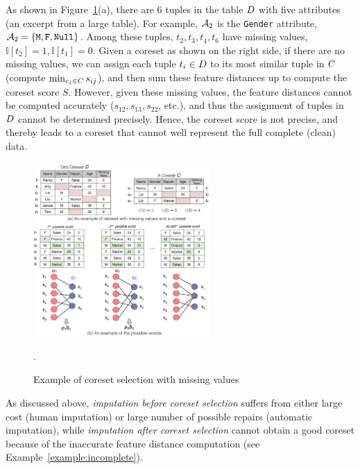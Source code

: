 \begin{example} \label{example:incomplete}
	As shown in  Figure~\ref{fig:missing}(a), there are 6 tuples in the table $D$ with five attributes (an excerpt from a large table). For example, $\mathcal{A}_2$ is the \texttt{Gender} attribute, \ie $\mathcal{A}_2 = \{ \texttt{M}, \texttt{F}, \texttt{Null} \}$.
	 Among these tuples, $t_2, t_3, t_4, t_6$ have missing values, \eg $\mathbb{I}[t_2] = 1, \mathbb{I}[t_1] = 0$. Given a coreset as shown on the right side, if there are no missing values, we can assign each tuple $t_i\in D$ to its most similar tuple in $C$ (compute $\min_{c_j\in C}s_{ij}$), and then sum these feature distances up to  compute the coreset score  $S$. However, given these missing values, the feature distances cannot be computed accurately (\eg $s_{12}, s_{13}, s_{22}$, etc.), and thus the assignment of tuples in $D$ cannot be determined precisely. Hence, the coreset score is not precise, and thereby leads to a  coreset that cannot well represent the full complete (clean) data. 
	 \vspace{-0.3em}
\end{example}


\begin{figure}[t]
	\centering
	\includegraphics[width=0.6\textwidth]{figs/missExample}
	\caption{Example of coreset selection with missing values}.
	\label{fig:missing}
\end{figure}

As discussed above, \textit{imputation before coreset selection} suffers from either large cost (human imputation) or large number of possible repairs (automatic imputation), while \textit{imputation after coreset selection} cannot obtain a good coreset  because of the inaccurate feature distance computation (see Example~\ref{example:incomplete}).


